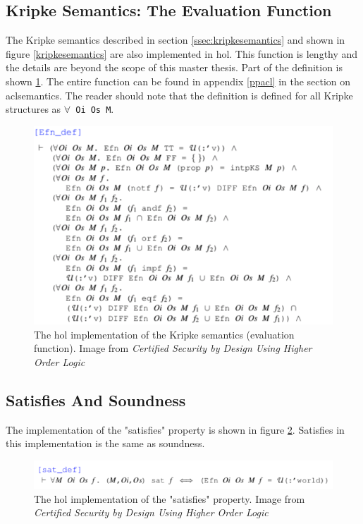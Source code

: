 \documentclass[../../main/main.tex]{subfiles}
\begin{document}
\subsection{Kripke Semantics: The Evaluation Function}
The Kripke semantics described in section \ref{ssec:kripkesemantics} and shown in figure \ref{kripkesemantics} are also implemented in \gls{hol}.  This function is lengthy and the details are beyond the scope of this master thesis.  Part of the definition is shown \ref{Efn}.  The entire function can be found in appendix \ref{ppacl} in the section on aclsemantics.  The reader should note that the definition is defined for all Kripke structures as \texttt{$\forall$ Oi Os M}.


\begin{figure}[h]
\centering
\includegraphics[width=\textwidth]{../figures/Efn}
\caption{\label{Efn}The \gls{hol} implementation of the Kripke semantics (evaluation function).  Image from  \textit{Certified Security by Design Using Higher Order Logic}\cite{certmanual}}
\end{figure}


\subsection{Satisfies And Soundness}
The implementation of the "satisfies" property is shown in figure \ref{satdef}.  Satisfies in this implementation is the same as soundness.
\begin{figure}[h]
\centering
\includegraphics[width=\textwidth]{../figures/satdef}
\caption{\label{satdef}The \gls{hol} implementation of the "satisfies" property.  Image from  \textit{Certified Security by Design Using Higher Order Logic}\cite{certmanual}}
\end{figure}
\end{document}
